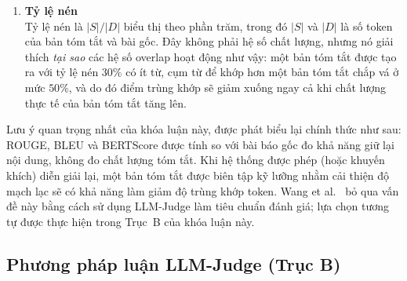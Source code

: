 \begin{enumerate}[label=(\alph*), leftmargin=*]
    Trong khóa luận này, mô hình embedding được sử dụng là \texttt{vinai/}\allowbreak\texttt{phobert-}\allowbreak\texttt{base} với đầu vào được cắt ngắn xuống còn $256$ token trước khi tính điểm, vừa phù hợp cửa sổ ngữ cảnh của mô hình vừa chuẩn hóa chi phí một lần gọi đánh giá. BERTScore nắm bắt được sự tương đồng ngữ nghĩa mà các hệ số overlap bỏ sót, nhưng vẫn chấm điểm so với bài báo gốc, do đó nó kế thừa cùng một ý nghĩa về khả năng lưu trữ nội dung tương tự như ROUGE và BLEU.

    \item \textbf{Tỷ lệ nén} \\
    Tỷ lệ nén là $|S| / |D|$ biểu thị theo phần trăm, trong đó $|S|$ và $|D|$ là số token của bản tóm tắt và bài gốc. Đây không phải hệ số chất lượng, nhưng nó giải thích \textit{tại sao} các hệ số overlap hoạt động như vậy: một bản tóm tắt được tạo ra với tỷ lệ nén $30\%$ có ít từ, cụm từ để khớp hơn một bản tóm tắt chắp vá ở mức $50\%$, và do đó điểm trùng khớp sẽ giảm xuống ngay cả khi chất lượng thực tế của bản tóm tắt tăng lên.

\end{enumerate}

Lưu ý quan trọng nhất của khóa luận này, được phát biểu lại chính thức như sau: ROUGE, BLEU và BERTScore được tính so với bài báo gốc đo khả năng giữ lại nội dung, không đo chất lượng tóm tắt. Khi hệ thống được phép (hoặc khuyến khích) diễn giải lại, một bản tóm tắt được biên tập kỹ lưỡng nhằm cải thiện độ mạch lạc sẽ có khả năng làm giảm độ trùng khớp token. Wang et al.\ \cite{Wang2024} bỏ qua vấn đề này bằng cách sử dụng LLM-Judge làm tiêu chuẩn đánh giá; lựa chọn tương tự được thực hiện trong Trục~B của khóa luận này.

\subsection{Phương pháp luận LLM-Judge (Trục B)}

